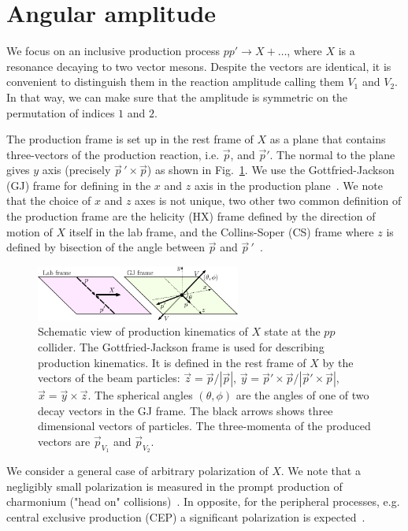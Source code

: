\documentclass[prd,preprintnumbers,floatfix,
nofootinbib,superscriptaddress]{revtex4}
\begin{document}
\section{Angular amplitude} \label{sec:reaction.amplitude}
We focus on an inclusive production process $p p'\to X + \dots$, where $X$ is a resonance decaying to two vector mesons.
Despite the vectors are identical, it is convenient to distinguish them in the reaction amplitude calling them $V_1$ and $V_2$.
In that way, we can make sure that the amplitude is symmetric on the permutation of indices $1$ and $2$.

The production frame is set up in the rest frame of $X$ as a plane that contains three-vectors of the
production reaction, i.e. $\vec p$, and $\vec p'$. The normal to the plane gives $y$ axis (precisely $\vec p\,'\times \vec p$) as shown in Fig.~\ref{fig:production}.
We use the Gottfried-Jackson (GJ) frame for defining in the $x$ and $z$ axis in the production plane~\cite{Gottfried:1964nx}.
We note that the choice of $x$ and $z$ axes is not unique, two other two common definition of the production frame are the helicity (HX) frame
defined by the direction of motion of $X$ itself in the lab frame, and the Collins-Soper (CS) frame where $z$ is defined by bisection of the angle between $\vec p$ and $\vec p\,'$~\cite{Faccioli:2010kd}.
\begin{figure}
  \includegraphics[width=0.6\textwidth]{../plots/production_GJ.pdf}
  \caption{Schematic view of production kinematics of $X$ state at the $pp$ collider.
  The Gottfried-Jackson frame is used for describing production kinematics.
  It is defined in the rest frame of $X$ by the vectors of the beam particles:
  $\vec z = \vec p / |\vec p|$, $\vec y = \vec p' \times \vec p / |\vec p' \times \vec p|$, $\vec x = \vec y \times \vec z$.
  The spherical angles $(\theta,\phi)$ are the angles of one of two decay vectors in the GJ frame.
  The black arrows shows three dimensional vectors of particles.
  The three-momenta of the produced vectors are $\vec p_{V_1}$ and $\vec p_{V_2}$.
  }
  \label{fig:production}
\end{figure}

We consider a general case of arbitrary polarization of $X$.
We note that a negligibly small polarization is measured in the prompt production of charmonium ("head on" collisions)~\cite{Aaij:2013nlm,Chatrchyan:2012woa,CDF:2011ag, Aaij:2013oxa,Sirunyan:2018bfd}.
In opposite, for the peripheral processes, e.g. central exclusive production (CEP) a significant polarization is expected~\cite{Pasechnik:2010pq}.
\end{document}
